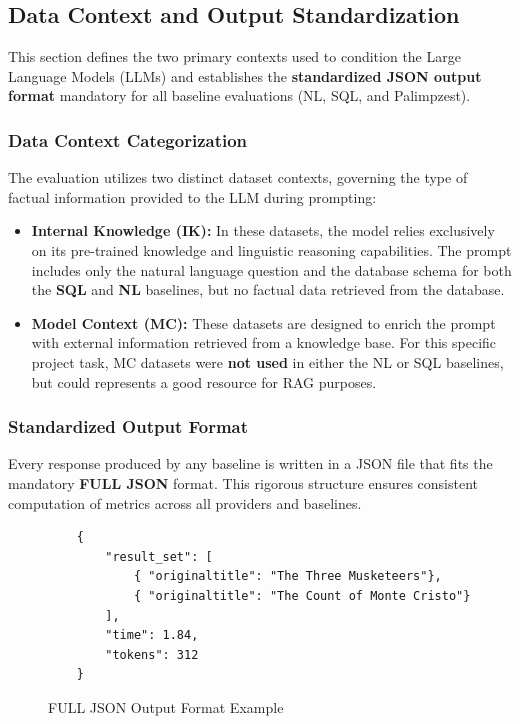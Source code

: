 \subsection{Data Context and Output Standardization}

This section defines the two primary contexts used to condition the Large Language Models (LLMs) and establishes the \textbf{standardized JSON output format} mandatory for all baseline evaluations (NL, SQL, and Palimpzest).

\medskip

\subsubsection{Data Context Categorization}

The evaluation utilizes two distinct dataset contexts, governing the type of factual information provided to the LLM during prompting:

\begin{itemize} [leftmargin=*]
    \item \textbf{Internal Knowledge (IK):} In these datasets, the model relies exclusively on its pre-trained knowledge and linguistic reasoning capabilities. The prompt includes only the natural language question and the database schema for both the \textbf{SQL} and \textbf{NL} baselines, but no factual data retrieved from the database.
    \item \textbf{Model Context (MC):} These datasets are designed to enrich the prompt with external information retrieved from a knowledge base. For this specific project task, MC datasets were \textbf{not used} in either the NL or SQL baselines, but could represents a good resource for RAG purposes.
\end{itemize}

\medskip

\subsubsection{Standardized Output Format}

Every response produced by any baseline is written in a JSON file that fits the mandatory \textbf{FULL JSON} format. This rigorous structure ensures consistent computation of metrics across all providers and baselines.

\begin{figure}[h!]
    \centering
    \begin{verbatim}
    {
        "result_set": [
            { "originaltitle": "The Three Musketeers"},
            { "originaltitle": "The Count of Monte Cristo"}
        ],
        "time": 1.84,
        "tokens": 312
    }
    \end{verbatim}
    \caption{FULL JSON Output Format Example}
\end{figure}

